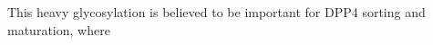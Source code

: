 This heavy glycosylation is believed to be important for DPP4 sorting and maturation, where \cite{Matter_1991}